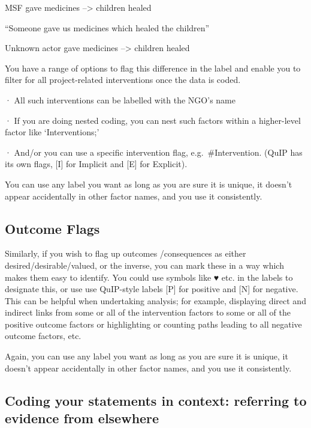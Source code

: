 \documentclass[
]{book}
\begin{document}
MSF gave medicines --\textgreater{} children healed

``Someone gave us medicines which healed the children''

Unknown actor gave medicines --\textgreater{} children healed

You have a range of options to flag this difference in the label and enable you to filter for all project-related interventions once the data is coded.

· All such interventions can be labelled with the NGO's name

· If you are doing nested coding, you can nest such factors within a higher-level factor like `Interventions;'

· And/or you can use a specific intervention flag, e.g.~\#Intervention. (QuIP has its own flags, {[}I{]} for Implicit and {[}E{]} for Explicit).

You can use any label you want as long as you are sure it is unique, it doesn't appear accidentally in other factor names, and you use it consistently.

\hypertarget{outcome-flags}{%
\subsection{Outcome Flags}\label{outcome-flags}}

Similarly, if you wish to flag up outcomes /consequences as either desired/desirable/valued, or the inverse, you can mark these in a way which makes them easy to identify. You could use symbols like ♥ etc. in the labels to designate this, or use use QuIP-style labels {[}P{]} for positive and {[}N{]} for negative. This can be helpful when undertaking analysis; for example, displaying direct and indirect links from some or all of the intervention factors to some or all of the positive outcome factors or highlighting or counting paths leading to all negative outcome factors, etc.

Again, you can use any label you want as long as you are sure it is unique, it doesn't appear accidentally in other factor names, and you use it consistently.

\hypertarget{coding-your-statements-in-context-referring-to-evidence-from-elsewhere}{%
\subsection{Coding your statements in context: referring to evidence from elsewhere}\label{coding-your-statements-in-context-referring-to-evidence-from-elsewhere}}
\end{document}

